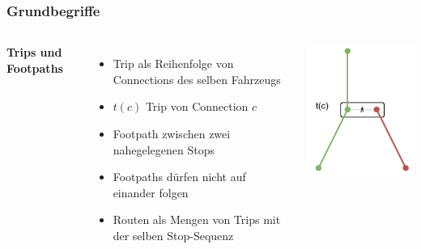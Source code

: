 \documentclass[aspectratio=169]{beamer}
\begin{document}
\begin{frame}
\frametitle{Grundbegriffe}
\begin{columns}[c] %
	
	\textbf{Trips und Footpaths}
	\begin{itemize}
		\item Trip als Reihenfolge von Connections des selben Fahrzeugs
		\item $t(c)$ Trip von Connection $c$
		\item Footpath zwischen zwei nahegelegenen Stops
		\item Footpaths dürfen nicht auf einander folgen
		\item Routen als Mengen von Trips mit der selben Stop-Sequenz
	\end{itemize}
	\includegraphics[scale=1.2]{trips_footpaths.pdf}	
\end{columns}
\end{frame}

\end{document}
